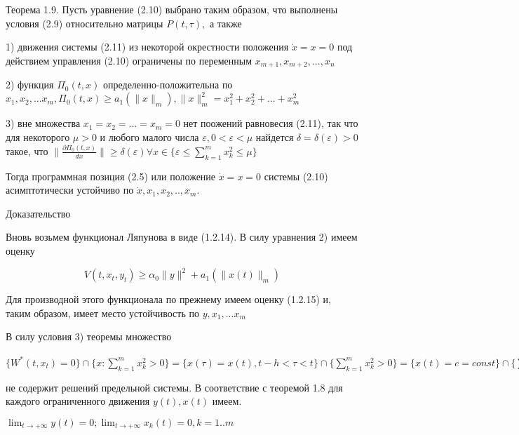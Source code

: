 \begin{theorem}
{\begin{theorem}\label{t-1.9}
Теорема 1.9. Пусть уравнение (2.10) выбрано таким образом, что выполнены условия (2.9) относительно матрицы $P(t, \tau),$ а также 

1) движения системы (2.11) из некоторой окрестности положения $\dot x = x= 0$ под действием управления (2.10) ограничены по переменным $x_{m+1}, x_{m+2}, ... , x_n$ 

2) функция $\Pi_0 (t, x)$ определенно-положительна по $x_1, x_2, ... x_m, \Pi_0(t, x) \ge a_1 (\| x \|_m), \| x \|^2_m = x_1^2 + x_2^2 + ... + x_m^2$ 

3) вне множества ${x_1 = x_2 = ... = x_m = 0}$ нет поожений равновесия (2.11), так что для некоторого $\mu > 0$ и любого малого числа  $\varepsilon, 0 < \varepsilon < \mu$ найдется $\delta = \delta(\varepsilon) > 0$ такое, что $\| \frac{\partial \Pi_0 (t, x)}{dx} \| \ge \delta(\varepsilon) \forall x \in \lbrace \varepsilon \le \sum_{k = 1}^{m} x_k^2 \le \mu \rbrace$

Тогда программная позиция (2.5) или положение $\dot x = x = 0$ системы (2.10) асимптотически устойчиво по $\dot x, x_1, x_2,.., x_m.$
\end{theorem}

Доказательство 

Вновь возьмем функционал Ляпунова в виде (1.2.14). В силу уравнения 2) имеем оценку

\begin{equation}
V(t, x_t, y_t) \ge \alpha_0 \| y \| ^2 + a_1 (\| x(t) \|_m)
\end{equation}

Для производной этого функционала по прежнему имеем оценку (1.2.15) и, таким образом, имеет место устойчивость по $y, x_1, ... x_m$

В силу условия 3) теоремы множество 

$ \lbrace W^{*} (t, x_t) = 0 \rbrace \cap \lbrace x : \sum_{k = 1}^{m} x_k^2 > 0 \rbrace = \lbrace x(\tau) = x(t), t - h < \tau < t \rbrace \cap \lbrace \sum_{k = 1}^{m} x_k^2 > 0 \rbrace = \lbrace x(t) = c = const \rbrace \cap \lbrace \sum_{k = 1}^{m} x_k^2 > 0 \rbrace = \lbrace x: \frac{\partial \Pi^{*} (x)}{\partial x} = 0 \rbrace \cap \lbrace \sum_{k = 1}^{m} x_k^2 > 0 \rbrace$

не содержит решений предельной системы. В соответствие с теоремой 1.8 для каждого ограниченного движения $y(t), x(t)$ имеем.

$\lim_{t \to + \infty} y(t) = 0; \lim_{t \to + \infty} x_k (t) = 0, k = 1..m$

}
\end{theorem}
